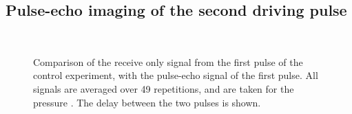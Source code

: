 \subsection{Pulse-echo imaging of the second driving pulse}




\begin{figure}[t]%
  \centering
 \quad
  \\
 \quad
\caption{
    Comparison of the  receive only signal from the first pulse of the control experiment,
    with the pulse-echo signal of the first pulse.
    All signals are averaged over 49 repetitions, and are taken for the pressure \pOOE.
    The delay between the two pulses is shown.
  }
  \label{fig:2nd:av:time:comp:control}
\end{figure}




